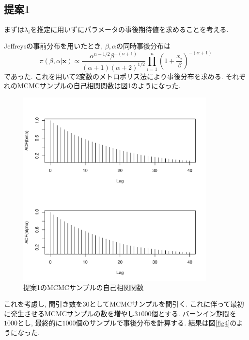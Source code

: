 \documentclass[titlepage,twoside]{jarticle}
\theoremstyle{definition}
\begin{document}
\subsection{提案1}\label{suggestion1}
まずは$\lambda_i $を推定に用いずにパラメータの事後期待値を求めることを考える.

Jeffreysの事前分布を用いたとき, $\beta,\alpha$の同時事後分布は
$$
\pi(\beta ,\alpha |\bm{x})
\propto
\frac{\alpha^{n-1/2}\beta ^{-(n+1)}}{(\alpha +1)(\alpha +2)^{1/2}}
\prod_{i=1}^{n}
\left(1+\frac{x_{i}}{\beta }
\right)^{-(\alpha +1)}
$$
であった. これを用いて$2$変数のメトロポリス法により事後分布を求める.
それぞれのMCMCサンプルの自己相関関数は図\ref{fig3}のようになった. 
\begin{figure}[ht]
\begin{center}
\includegraphics[width=100mm]{acf_notlambda}
\caption{提案1のMCMCサンプルの自己相関関数}
\label{fig3}
\end{center}
\end{figure}
これを考慮し, 間引き数を$30$としてMCMCサンプルを間引く. これに伴って最初に発生させるMCMCサンプルの数を増やし$31000$個とする. バーンイン期間を$1000$とし, 最終的に$1000$個のサンプルで事後分布を計算する. 結果は図\ref{fig4}のようになった.
\end{document}
